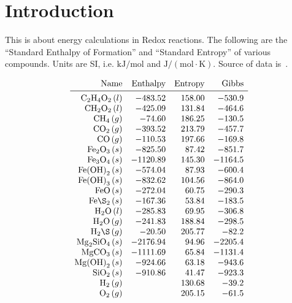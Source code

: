 \documentclass[a4paper,14pt]{extarticle}
\def\H{{\rm H}}
\def\O{{\rm O}}
\def\C{{\rm C}}
\def\Fe{{\rm Fe}}
\def\Mg{{\rm Mg}}
\def\Si{{\rm Si}}
\begin{document}

\section{Introduction}

This is about energy calculations in Redox reactions.
The following are the ``Standard Enthalpy of Formation'' and ``Standard Entropy'' of
various compounds. Units are SI, i.e. $\text{kJ}/\text{mol}$ and $\text{J}/(\text{mol}\cdot \text{K})$.
Source of data is~\cite{nist}.

\[
\begin{array}{rrrr}
    \text{Name}      & \text{Enthalpy} & \text{Entropy} & \text{Gibbs} \\
   \midrule
    \C_2\H_4\O_2 \,(l)  &  -483.52 & 158.00  &  -530.9 \\
    \C\H_2\O_2 \,(l)    &  -425.09 & 131.84  &  -464.6 \\
    \C\H_4 \,(g)        &   -74.60 & 186.25  &  -130.5 \\
    \C\O_2 \,(g)        &  -393.52 & 213.79  &  -457.7 \\
    \C\O \,(g)          &  -110.53 & 197.66  &  -169.8 \\
    \Fe_2\O_3 \,(s)     &  -825.50 &  87.42  &  -851.7 \\
    \Fe_3\O_4 \,(s)     & -1120.89 & 145.30  & -1164.5 \\
    \Fe{(\O\H)}_2 \,(s) &  -574.04 &  87.93  &  -600.4 \\
    \Fe{(\O\H)}_3 \,(s) &  -832.62 & 104.56  &  -864.0 \\
    \Fe\O \,(s)         &  -272.04 &  60.75  &  -290.3 \\
    \Fe\S_2 \,(s)       &  -167.36 &  53.84  &  -183.5 \\
    \H_2\O \,(l)        &  -285.83 &  69.95  &  -306.8 \\
    \H_2\O \,(g)        &  -241.83 & 188.84  &  -298.5 \\
    \H_2\S \,(g)        &   -20.50 & 205.77  &   -82.2 \\
    \Mg_2\Si\O_4 \,(s)  & -2176.94 &  94.96  & -2205.4 \\
    \Mg\C\O_3 \,(s)     & -1111.69 &  65.84  & -1131.4 \\
    \Mg{(\O\H)}_2 \,(s) &  -924.66 &  63.18  &  -943.6 \\
    \Si\O_2 \,(s)       &  -910.86 &  41.47  &  -923.3 \\
    \H_2 \,(g)          &          & 130.68  &   -39.2 \\
    \O_2 \,(g)          &          & 205.15  &   -61.5
\end{array}
\]
\end{document}
